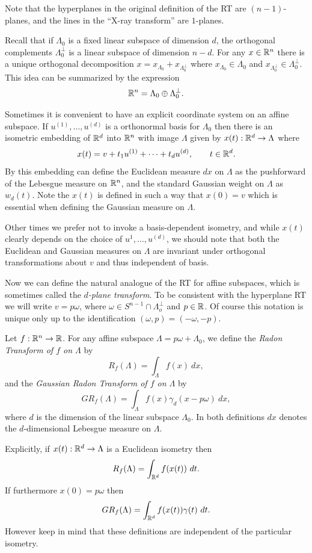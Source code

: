 \begin{remark}
  Note that the hyperplanes in the original definition of the RT are $(n-1)$-planes, and the lines in the ``X-ray transform'' are $1$-planes.
\end{remark}

Recall that if $\Lambda_0$ is a fixed linear subspace of dimension $d$, the orthogonal complements $\Lambda_0^\perp$ is a linear subspace of dimension $n - d$. For any $x \in \mathbb{R}^n$ there is a unique orthogonal decomposition $x = x_{\Lambda_0} + x_{\Lambda_0^\perp}$ where $x_{\Lambda_0} \in \Lambda_0$ and $x_{\Lambda_0^\perp} \in \Lambda_0^\perp$. This idea can be summarized by the expression
\[
  \mathbb{R}^n = \Lambda_0 \oplus \Lambda_0^\perp.
\]

Sometimes it is convenient to have an explicit coordinate system on an affine subspace. If $u^{(1)}, \ldots, u^{(d)}$ is a orthonormal basis for $\Lambda_0$ then there is an isometric embedding of $\mathbb{R}^d$ into $\mathbb{R}^n$ with image $\Lambda$ given by $x(t) : \mathbb{R}^d \rightarrow \Lambda$ where
\[
  x(t) = v + t_1u^{(1)} + \cdots + t_d u^{(d)}, \qquad t \in \mathbb{R}^d.
\]
By this embedding can define the Euclidean measure $dx$ on $\Lambda$ as the pushforward of the Lebesgue measure on $\mathbb{R}^n$, and the standard Gaussian weight on $\Lambda$ as $w_d(t)$. Note the $x(t)$ is defined in such a way that $x(0) = v$ which is essential when defining the Gaussian measure on $\Lambda$.

Other times we prefer not to invoke a basis-dependent isometry, and while $x(t)$ clearly depends on the choice of $u^{1}, \ldots, u^{(d)}$, we should note that both the Euclidean and Gaussian measures on $\Lambda$ are invariant under orthogonal transformations about $v$ and thus independent of basis.

Now we can define the natural analogue of the RT for affine subspaces, which is sometimes called the \emph{$d$-plane transform}. To be consistent with the hyperplane RT we will write $v = p\omega$, where $\omega \in S^{n-1} \cap \Lambda_o^\perp$ and $p \in \mathbb{R}$. Of course this notation is unique only up to the identification $(\omega, p) = (-\omega, -p)$.

\begin{definition}
  Let $f:\mathbb{R}^n \rightarrow \mathbb{R}$. For any affine subspace $\Lambda = p\omega + \Lambda_0$, we define the \emph{Radon Transform of $f$ on $\Lambda$} by
  \[
    R_f(\Lambda) = \int_{\Lambda} f(x)~dx,
  \]
  and the \emph{Gaussian Radon Transform of $f$ on $\Lambda$} by 
  \[
    GR_f(\Lambda) = \int_{\Lambda} f(x) \gamma_d(x - p\omega) ~dx,
  \]
  where $d$ is the dimension of the linear subspace $\Lambda_0$. In both definitions $dx$ denotes the $d$-dimensional Lebesgue measure on $\Lambda$.
\end{definition}
\begin{remark}
  Explicitly, if $x(t): \mathbb{R}^d \rightarrow \Lambda$ is a Euclidean isometry then 
  \[
    R_f(\Lambda) = \int_{\mathbb{R}^d} f(x(t))~dt.
  \]
  If furthermore $x(0) = p\omega$ then
  \[
    GR_f(\Lambda) = \int_{\mathbb{R}^d} f(x(t))\gamma(t)~dt.
  \]
  However keep in mind that these definitions are independent of the particular isometry.
\end{remark}


